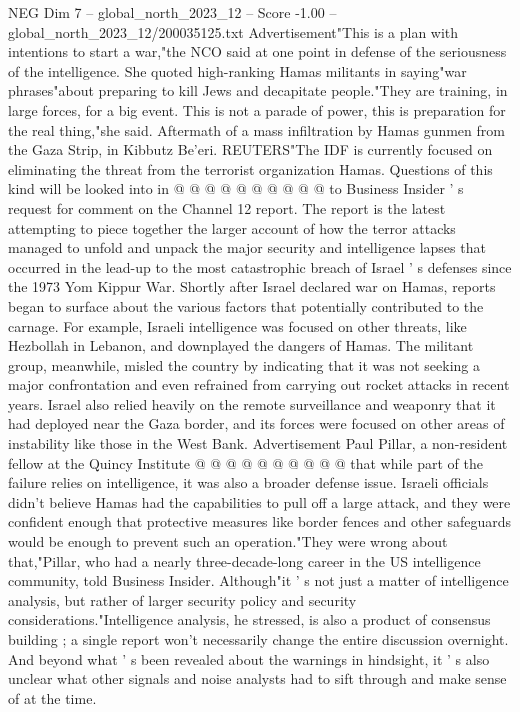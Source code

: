 \begin{textsample}{NEG Dim 7 – global\_north\_2023\_12 – Score -1.00 – global\_north\_2023\_12/200035125.txt}
Advertisement"This is a plan with intentions to start a war,"the NCO said at one point in defense of the seriousness of the intelligence.
She quoted high-ranking Hamas militants in saying"war phrases"about preparing to kill Jews and decapitate people."They are training, in large forces, for a big event.
This is not a parade of power, this is preparation for the real thing,"she said.
Aftermath of a mass infiltration by Hamas gunmen from the Gaza Strip, in Kibbutz Be'eri.
REUTERS"The IDF is currently focused on eliminating the threat from the terrorist organization Hamas.
Questions of this kind will be looked into in @ @ @ @ @ @ @ @ @ @ to Business Insider ' s request for comment on the Channel 12 report.
The report is the latest attempting to piece together the larger account of how the terror attacks managed to unfold and unpack the major security and intelligence lapses that occurred in the lead-up to the most catastrophic breach of Israel ' s defenses since the 1973 Yom Kippur War.
Shortly after Israel declared war on Hamas, reports began to surface about the various factors that potentially contributed to the carnage.
For example, Israeli intelligence was focused on other threats, like Hezbollah in Lebanon, and downplayed the dangers of Hamas.
The militant group, meanwhile, misled the country by indicating that it was not seeking a major confrontation and even refrained from carrying out rocket attacks in recent years.
Israel also relied heavily on the remote surveillance and weaponry that it had deployed near the Gaza border, and its forces were focused on other areas of instability like those in the West Bank.
Advertisement Paul Pillar, a non-resident fellow at the Quincy Institute @ @ @ @ @ @ @ @ @ @ that while part of the failure relies on intelligence, it was also a broader defense issue.
Israeli officials didn't believe Hamas had the capabilities to pull off a large attack, and they were confident enough that protective measures like border fences and other safeguards would be enough to prevent such an operation."They were wrong about that,"Pillar, who had a nearly three-decade-long career in the US intelligence community, told Business Insider.
Although"it ' s not just a matter of intelligence analysis, but rather of larger security policy and security considerations."Intelligence analysis, he stressed, is also a product of consensus building ; a single report won't necessarily change the entire discussion overnight.
And beyond what ' s been revealed about the warnings in hindsight, it ' s also unclear what other signals and noise analysts had to sift through and make sense of at the time.

\end{textsample}
